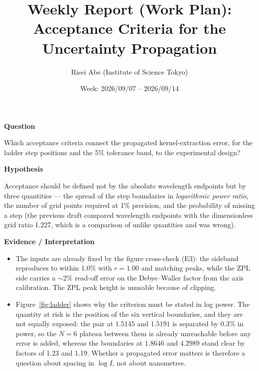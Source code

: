\documentclass[11pt,a4paper]{ltjsarticle}
\title{Weekly Report (Work Plan): Acceptance Criteria for the Uncertainty Propagation}
\author{Risei Abe (Institute of Science Tokyo)}
\date{Week: 2026/09/07 -- 2026/09/14}
\newcommand{\sectionblock}[1]{%
  \vspace{4mm}
  {\large\textbf{\textcolor{SciBlue}{#1}}}
  \vspace{2mm}

}
\begin{document}
\maketitle

\sectionblock{Question}

Which acceptance criteria connect the propagated kernel-extraction error, for the ladder step positions and the 5\% tolerance band, to the experimental design?

\sectionblock{Hypothesis}

Acceptance should be defined not by the absolute wavelength endpoints but by three quantities --- the spread of the step boundaries in \emph{logarithmic power ratio}, the number of grid points required at 1\% precision, and the probability of missing a step (the previous draft compared wavelength endpoints with the dimensionless grid ratio 1.227, which is a comparison of unlike quantities and was wrong).

\sectionblock{Evidence / Interpretation}

\begin{itemize}[leftmargin=8mm]
  \item The inputs are already fixed by the figure cross-check (E3): the sideband reproduces to within 1.0\% with \(r=1.00\) and matching peaks, while the ZPL side carries a \(\sim\)2\% read-off error on the Debye--Waller factor from the axis calibration. The ZPL peak height is unusable because of clipping.
  \item Figure~\ref{fig:ladder} shows why the criterion must be stated in log power. The quantity at risk is the position of the six vertical boundaries, and they are not equally exposed: the pair at \(1.5145\) and \(1.5191\) is separated by 0.3\% in power, so the \(N=6\) plateau between them is already unreachable before any error is added, whereas the boundaries at \(1.8646\) and \(4.2989\) stand clear by factors of 1.23 and 1.19. Whether a propagated error matters is therefore a question about spacing in \(\log I\), not about nanometres.
\end{itemize}
\end{document}
